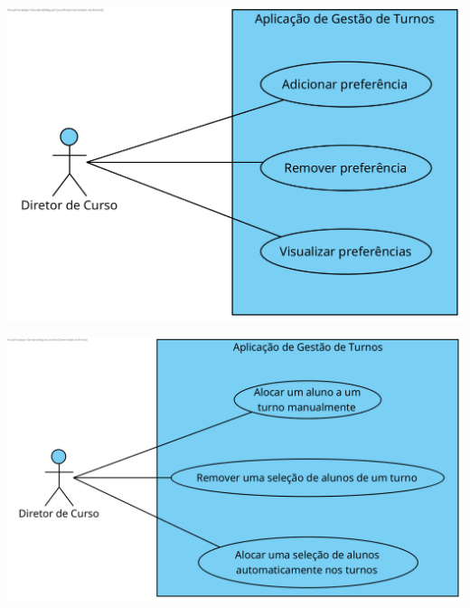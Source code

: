 \documentclass[a4paper,12pt]{scrreprt}
\begin{document}
\begin{minipage}{\textwidth}
    \centering
    \includegraphics[width=1\textwidth]{images/use-cases/diagrams/3-gestao-preferencias.png}
    \label{fig:2-3-diagrama_de_casos_de_uso_gestao_de_preferencias}
\end{minipage}

\vspace{1cm}

\begin{minipage}{\textwidth}
    \centering
    \includegraphics[width=1\textwidth]{images/use-cases/diagrams/4-alocacao-alunos.png}
    \label{fig:2-4-diagrama_de_casos_de_uso_alocacao_de_alunos}
\end{minipage}

\end{document}
